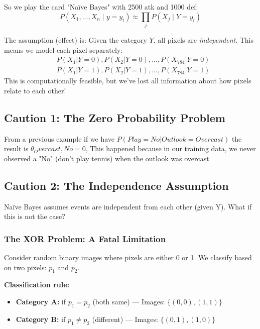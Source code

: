 So we play the card "Naïve Bayes" with 2500 atk and 1000 def:
\[
    P(X_1,\dots, X_n \mid y=y_i) \approx \prod_{j} P(X_j\mid Y=y_i)
\]

The assumption (effect) is: Given the category $Y$, all pixels are \textit{independent}. This means we model each pixel separately:
\[
    \begin{aligned}
        &P(X_1 | Y = 0), P(X_2 | Y = 0), ..., P(X_{784} | Y = 0)  \\
        &P(X_1 | Y = 1), P(X_2 | Y = 1), ..., P(X_{784} | Y = 1)  
    \end{aligned}
\]
This is computationally feasible, but we've lost all information about how pixels relate to each other!
\subsection{Caution 1: The Zero Probability Problem}

From a previous example if we have $P(Play = No|Outlook = Overcast)$ the result is $\theta_Overcast,No = 0$, This happened because in our training data, we never observed a "No" (don't play tennis) when the outlook was overcast


\subsection{Caution 2: The Independence Assumption}
Naïve Bayes assumes events are independent from each other (given Y). What if this is not the case?

\subsubsection{The XOR Problem: A Fatal Limitation}

Consider random binary images where pixels are either 0 or 1. We classify based on two pixels: $p_1$ and $p_2$.

\textbf{Classification rule:}
\begin{itemize}
    \item \textbf{Category A:} if $p_1 = p_2$ (both same) — Images: $\{(0,0), (1,1)\}$
    \item \textbf{Category B:} if $p_1 \neq p_2$ (different) — Images: $\{(0,1), (1,0)\}$
\end{itemize}

